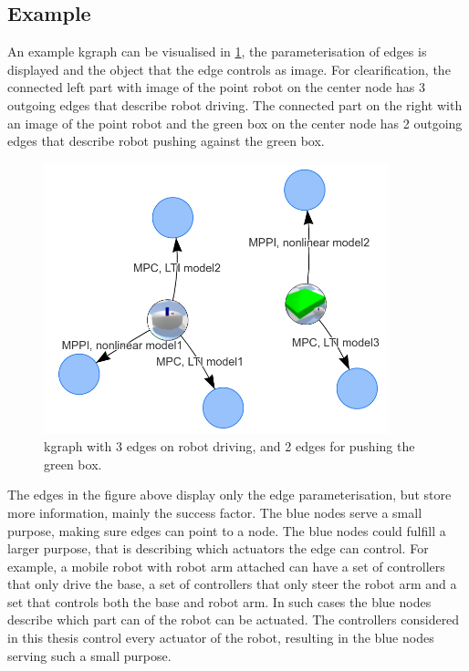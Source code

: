 \subsection{Example}%
\label{subsec:kgraph_example}
An example \ac{kgraph} can be visualised in \cref{fig:kgraph_example}, the parameterisation of edges is displayed and the object that the edge controls as image. For clearification, the connected left part with image of the point robot on the center node has 3 outgoing edges that describe robot driving. The connected part on the right with an image of the point robot and the green box on the center node has 2 outgoing edges that describe robot pushing against the green box.\bs

\begin{figure}[H]
    \centering
    \includegraphics[width=10cm]{figures/kgraph_example}
    \caption{\ac{kgraph} with 3 edges on robot driving, and 2 edges for pushing the green box.}%
    \label{fig:kgraph_example}
\end{figure}

The edges in the figure above display only the edge parameterisation, but store more information, mainly the success factor. The blue nodes serve a small purpose, making sure edges can point to a node. The blue nodes could fulfill a larger purpose, that is describing which actuators the edge can control. For example, a mobile robot with robot arm attached can have a set of controllers that only drive the base, a set of controllers that only steer the robot arm and a set that controls both the base and robot arm. In such cases the blue nodes describe which part can of the robot can be actuated. The controllers considered in this thesis control every actuator of the robot, resulting in the blue nodes serving such a small purpose.\bs
